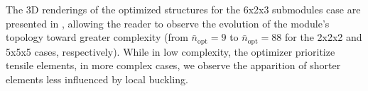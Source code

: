 The 3D renderings of the optimized structures for the 6x2x3 submodules case are presented in , allowing the reader to observe the evolution of the module's topology toward greater complexity (from $\bar{n}_\text{opt}=9$ to $\bar{n}_\text{opt}=88$ for the 2x2x2 and 5x5x5 cases, respectively). While in low complexity, the optimizer prioritize tensile elements, in more complex cases, we observe the apparition of shorter elements less influenced by local buckling.


\begin{figure}
    \hspace*{\fill}
    \hfill
    \hfill
    \hfill
    \hspace*{\fill}
    \bigskip
    \hspace*{\fill}

\end{figure}
